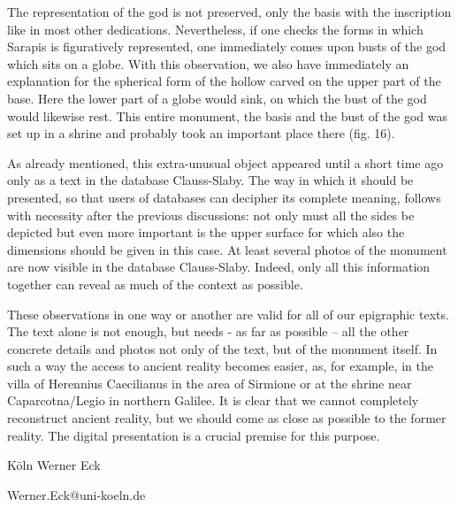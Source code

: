 \documentclass{article}
\begin{document}
The representation of the god is not preserved, only the basis with the inscription 
like in most other dedications. Nevertheless,\textbf{ }if one checks the forms 
in which Sarapis is figuratively represented, one immediately comes upon busts 
of the god which sits on a globe. With this observation, we also have immediately 
an explanation for the spherical form of the hollow carved on the upper part of 
the base.\textbf{ }Here the lower part of a globe would sink, on which the bust 
of the god would likewise rest. This entire monument, the basis and the bust of 
the god was set up in a shrine and probably took an important place there (fig. 
16). 

As already mentioned, this extra-unusual object appeared until a short time ago 
only as a text in the database Clauss-Slaby. The way in which it should be presented, 
so that users of databases can decipher its complete meaning, follows with necessity 
after the previous discussions: not only must all the sides be depicted but even 
more important is the upper surface for which also the dimensions should be given 
in this case. At least several photos of the monument are now visible in the database 
Clauss-Slaby. Indeed, only all this information together can reveal as much of 
the context as possible. 

These observations in one way or another are valid for all of our epigraphic texts. 
The text alone is not enough, but needs - as far as possible – all the other 
concrete details and photos not only of the text, but of the monument itself. In 
such a way the access to ancient reality becomes easier, as, for example, in the 
villa of Herennius Caecilianus in the area of Sirmione or at the shrine near Caparcotna/Legio 
in northern Galilee. It is clear that we cannot completely reconstruct ancient 
reality, but we should come as close as possible to the former reality. The digital 
presentation is a crucial premise for this purpose.   

Köln          Werner Eck

Werner.Eck@uni-koeln.de 

\newpage
\end{document}
